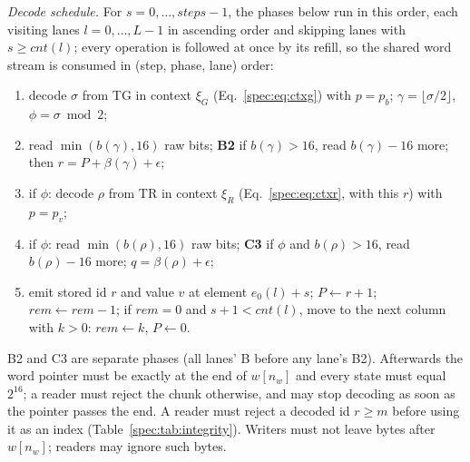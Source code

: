\emph{Decode schedule.} For $s=0,\dots,\mathit{steps}-1$, the phases below run in this order, each visiting lanes
$l=0,\dots,L-1$ in ascending order and skipping lanes with $s\ge\mathit{cnt}(l)$; every operation is followed at once
by its refill, so the shared word stream is consumed in (step, phase, lane) order:
\begin{enumerate}\setlength{\itemsep}{0pt}
\item[A] decode $\sigma$ from TG in context $\xi_G$ (Eq.~\ref{spec:eq:ctxg}) with $p=p_b$; $\gamma=\lfloor\sigma/2\rfloor$, $\phi=\sigma\bmod2$;
\item[B] read $\min(b(\gamma),16)$ raw bits; \textbf{B2} if $b(\gamma)>16$, read $b(\gamma)-16$ more; then $r=P+\beta(\gamma)+\epsilon$;
\item[C1] if $\phi$: decode $\rho$ from TR in context $\xi_R$ (Eq.~\ref{spec:eq:ctxr}, with this $r$) with $p=p_v$;
\item[C2] if $\phi$: read $\min(b(\rho),16)$ raw bits; \textbf{C3} if $\phi$ and $b(\rho)>16$, read $b(\rho)-16$ more; $q=\beta(\rho)+\epsilon$;
\item[E] emit stored id $r$ and value $v$ at element $e_0(l)+s$; $P\leftarrow r+1$; $\mathit{rem}\leftarrow\mathit{rem}-1$; if $\mathit{rem}=0$ and $s+1<\mathit{cnt}(l)$, move to the next column with $k>0$: $\mathit{rem}\leftarrow k$, $P\leftarrow0$.
\end{enumerate}
B2 and C3 are separate phases (all lanes' B before any lane's B2). Afterwards the word pointer must be exactly at the
end of $w[n_w]$ and every state must equal $2^{16}$; a reader must reject the chunk otherwise, and may stop decoding as
soon as the pointer passes the end. A reader must reject a decoded id $r\ge m$ before using it as an index
(Table~\ref{spec:tab:integrity}). Writers must not leave bytes after $w[n_w]$; readers may ignore such bytes.

